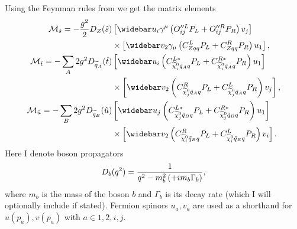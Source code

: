 \documentclass[english,notitlepage]{article}
\begin{document}
    Using the Feynman rules from  we get the matrix elements
    \begin{subequations}
        \begin{align}
            \nonumber
            \M_{\hat{s}} = -\frac{g^2}{2} D_Z(\hat{s})       & \bclosed{ \wbar{u}_i\gamma^\mu\pclosed{O^{\prime\prime L}_{ij}P_L + O^{\prime\prime R}_{ij}P_R} v_j }           \\
                                                                  & \times \bclosed{ \wbar{v}_2 \gamma_\mu \pclosed{C^L_{Zqq}P_L + C^R_{Zqq}P_R} u_1 },                             \\
            \nonumber
            \M_{\hat{t}} = -\sum_A 2g^2 D_{\wtilde{q}_A}(\hat{t}) & \bclosed{ \wbar{u}_i \pclosed{C_{\nino[i]\tilde{q}_Aq}^{L\ast}P_L + C_{\nino[i]\tilde{q}_Aq}^{R\ast} P_R} u_1 } \\
                                                                  & \times \bclosed{ \wbar{v}_2 \pclosed{C^R_{\nino[j]\tilde{q}_Aq}P_L + C^L_{\nino[j]\tilde{q}_Aq}P_R} v_j },      \\
            \nonumber
            \M_{\hat{u}} = -\sum_B 2g^2 D_{\wtilde{q}_B}(\hat{u}) & \bclosed{ \wbar{u}_j \pclosed{C_{\nino[j]\tilde{q}_Bq}^{L\ast}P_L + C_{\nino[j]\tilde{q}_Bq}^{R\ast} P_R} u_1 } \\
                                                                  & \times \bclosed{ \wbar{v}_2 \pclosed{C^R_{\nino[i]\tilde{q}_Bq}P_L + C^L_{\nino[i]\tilde{q}_Bq}P_R} v_i }.
        \end{align}
    \end{subequations}
    Here I denote boson propagators
    \[
        D_b(q^2) = \frac{1}{q^2 - m_b^2 \left(+ i m_b \Gamma_b\right)},
    \]
    where \(m_b\) is the mass of the boson \(b\) and \(\Gamma_b\) is its decay rate (which I will optionally include if stated).
    Fermion spinors \(u_a, v_a\) are used as a shorthand for \(u(p_a), v(p_a)\) with \(a \in 1, 2, i, j\).
\end{document}
